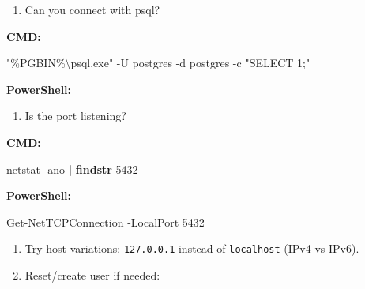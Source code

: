 \documentclass[
  letterpaper,
  DIV=11,
  numbers=noendperiod]{scrartcl}
\newenvironment{Shaded}{\begin{snugshade}}{\end{snugshade}}
\newcommand{\AttributeTok}[1]{\textcolor[rgb]{0.40,0.45,0.13}{#1}}
\newcommand{\DecValTok}[1]{\textcolor[rgb]{0.68,0.00,0.00}{#1}}
\newcommand{\KeywordTok}[1]{\textcolor[rgb]{0.00,0.23,0.31}{\textbf{#1}}}
\newcommand{\NormalTok}[1]{\textcolor[rgb]{0.00,0.23,0.31}{#1}}
\newcommand{\OperatorTok}[1]{\textcolor[rgb]{0.37,0.37,0.37}{#1}}
\newcommand{\PreprocessorTok}[1]{\textcolor[rgb]{0.68,0.00,0.00}{#1}}
\newcommand{\StringTok}[1]{\textcolor[rgb]{0.13,0.47,0.30}{#1}}
\newcommand{\VariableTok}[1]{\textcolor[rgb]{0.07,0.07,0.07}{#1}}
\providecommand{\tightlist}{%
  \setlength{\itemsep}{0pt}\setlength{\parskip}{0pt}}\usepackage{longtable,booktabs,array}
\begin{document}
\begin{enumerate}
\def\labelenumi{\arabic{enumi}.}
\setcounter{enumi}{2}
\tightlist
\item
  Can you connect with psql?
\end{enumerate}

\textbf{CMD:}

\begin{Shaded}
\begin{Highlighting}[]
\StringTok{"}\PreprocessorTok{\%}\VariableTok{PGBIN}\PreprocessorTok{\%}\StringTok{\textbackslash{}psql.exe"}\NormalTok{ {-}U postgres }\AttributeTok{{-}d}\NormalTok{ postgres }\AttributeTok{{-}c} \StringTok{"SELECT 1;"}
\end{Highlighting}
\end{Shaded}

\textbf{PowerShell:}

\begin{Shaded}
\end{Shaded}

\begin{enumerate}
\def\labelenumi{\arabic{enumi}.}
\setcounter{enumi}{3}
\tightlist
\item
  Is the port listening?
\end{enumerate}

\textbf{CMD:}

\begin{Shaded}
\begin{Highlighting}[]
\NormalTok{netstat }\AttributeTok{{-}ano} \KeywordTok{|} \KeywordTok{findstr}\NormalTok{ 5432}
\end{Highlighting}
\end{Shaded}

\textbf{PowerShell:}

\begin{Shaded}
\begin{Highlighting}[]
\NormalTok{Get{-}NetTCPConnection }\OperatorTok{{-}}\NormalTok{LocalPort }\DecValTok{5432}
\end{Highlighting}
\end{Shaded}

\begin{enumerate}
\def\labelenumi{\arabic{enumi}.}
\setcounter{enumi}{4}
\item
  Try host variations: \texttt{127.0.0.1} instead of \texttt{localhost}
  (IPv4 vs IPv6).
\item
  Reset/create user if needed:
\end{enumerate}
\end{document}
